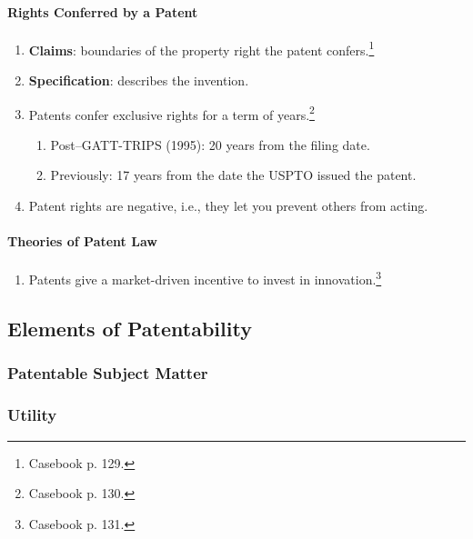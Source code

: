 \paragraph{Rights Conferred by a Patent}

\begin{enumerate}
    \item \textbf{Claims}: boundaries of the property right the patent 
    confers.\footnote{Casebook p. 129.}
    \item \textbf{Specification}: describes the invention.
    \item Patents confer exclusive rights for a term of years.\footnote{Casebook 
    p. 130.}
    \begin{enumerate}
        \item Post--GATT-TRIPS (1995): 20 years from the filing date.
        \item Previously: 17 years from the date the USPTO issued the patent.
    \end{enumerate}
    \item Patent rights are negative, i.e., they let you prevent others from 
    acting.
\end{enumerate}

\paragraph{Theories of Patent Law}

\begin{enumerate}
    \item Patents give a market-driven incentive to invest in 
    innovation.\footnote{Casebook p. 131.}
\end{enumerate}

\subsection{Elements of Patentability}

\subsubsection{Patentable Subject Matter}





\subsubsection{Utility}

